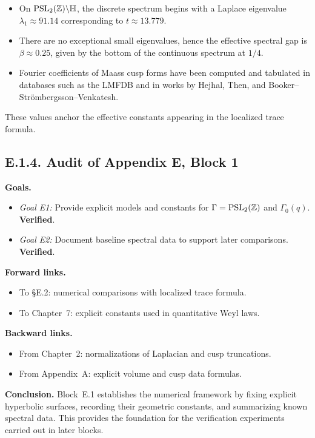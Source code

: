 \begin{itemize}
  \item On $\operatorname{PSL}_2(\mathbb Z)\backslash\mathbb H$, the discrete spectrum begins with a Laplace eigenvalue $\lambda_1\approx 91.14$ corresponding to $t\approx 13.779$.
  \item There are no exceptional small eigenvalues, hence the effective spectral gap is $\beta \approx 0.25$, given by the bottom of the continuous spectrum at $1/4$.
  \item Fourier coefficients of Maass cusp forms have been computed and tabulated in databases such as the LMFDB and in works by Hejhal, Then, and Booker–Strömbergsson–Venkatesh.
\end{itemize}

These values anchor the effective constants appearing in the localized trace formula.

\medskip
\subsection*{E.1.4. Audit of Appendix E, Block 1}

\noindent \textbf{Goals.}
\begin{itemize}
  \item \emph{Goal E1:} Provide explicit models and constants for $\Gamma=\operatorname{PSL}_2(\mathbb Z)$ and $\Gamma_0(q)$. \textbf{Verified}.
  \item \emph{Goal E2:} Document baseline spectral data to support later comparisons. \textbf{Verified}.
\end{itemize}

\noindent \textbf{Forward links.}
\begin{itemize}
  \item To \S E.2: numerical comparisons with localized trace formula.
  \item To Chapter~7: explicit constants used in quantitative Weyl laws.
\end{itemize}

\noindent \textbf{Backward links.}
\begin{itemize}
  \item From Chapter~2: normalizations of Laplacian and cusp truncations.
  \item From Appendix~A: explicit volume and cusp data formulas.
\end{itemize}

\medskip
\noindent \textbf{Conclusion.}
Block~E.1 establishes the numerical framework by fixing explicit hyperbolic surfaces, 
recording their geometric constants, and summarizing known spectral data. 
This provides the foundation for the verification experiments carried out in later blocks.

